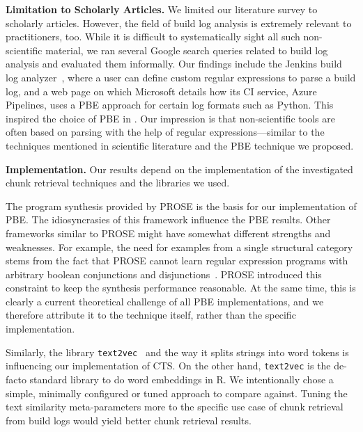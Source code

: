 \documentclass[10pt,journal,compsoc]{IEEEtran}
\begin{document}
\textbf{Limitation to Scholarly Articles.} We limited our literature
survey to scholarly articles.
However, the field of build log analysis is extremely relevant to
practitioners, too.
While it is difficult to systematically sight all such non-scientific
material, we ran several Google search queries related to build log
analysis and evaluated them informally.
Our findings include the Jenkins build log
analyzer~\cite{jenkins2020failure-analyzer}, where a user can
define custom regular expressions to parse a build log, and a web page
on which Microsoft details how its CI service, Azure Pipelines, uses a
PBE approach for certain log formats such as Python.
This inspired the choice of PBE in .
Our impression is that non-scientific tools are often based on
parsing with the help of regular expressions---similar to the
techniques mentioned in scientific literature and the PBE technique
we proposed.

\textbf{Implementation.}
Our results depend on the implementation of the investigated chunk
retrieval techniques and the libraries we used.

The program synthesis
provided by PROSE is the basis for our implementation of PBE\@.
The
idiosyncrasies of this framework influence the PBE results.
Other
frameworks similar to PROSE might have somewhat different strengths
and weaknesses.
For example, the need for examples from a single
structural category stems from the fact that PROSE cannot learn
regular expression programs with arbitrary boolean conjunctions and
disjunctions~\cite{mayer2015user}.
PROSE introduced this constraint
to keep the synthesis performance reasonable.
At the same time, this
is clearly a current theoretical challenge of all PBE implementations,
and we therefore attribute it to the technique itself, rather than the
specific implementation.

Similarly, the library
{\tt text2vec}~\cite{text2vec2019webpage}
and the way it splits strings into word tokens is influencing
our implementation of CTS\@.
On the other hand,
{\tt text2vec} is the de-facto standard library to do word embeddings
in R.
We intentionally chose a simple, minimally configured or tuned
approach to compare against.
Tuning the text similarity
meta-parameters more to the specific use case of chunk retrieval from
build logs would yield better chunk retrieval results.
\end{document}
